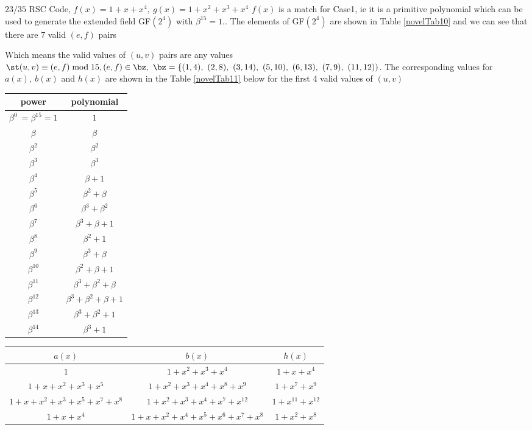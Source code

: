 \begin{example}
$23/35$ RSC Code, $f(x)=1+x+x^4,~g(x)=1+x^2+x^3+x^4$ \newline
$f(x)$ is a match for Case1, ie it is a primitive polynomial which can be used to generate the extended field GF$(2^4)$ with $\beta^{15}=1$.. The elements of GF$(2^4)$ are shown in Table \ref{novelTab10} and we can see that there are $7$ valid $(e,f)$ pairs
 
 Which means the valid values of $(u,v)$ pairs are any values $\st (u,v) \equiv (e,f) \bmod 15, (e,f) \in \bz,~\bz=\{(1,4),~(2,8) ,~(3,14) ,~(5,10) ,~(6,13) ,~(7,9) ,~(11,12))$.
 The corresponding values for $a(x),~b(x)$ and $h(x)$ are shown in the Table \ref{novelTab11} below for the first 4 valid values of $(u,v)$
 
  \begin{table*}[h]
 \caption{Non-zero Elements of GF$(2^4)$ generated by $f(x)=1+x+x^4$}
\centering
 \begin{tabular}{c c} 
 \hline
 power & polynomial \\ [0.5ex] 
 \hline\hline
$\beta^0~=\beta^{15}=1$ & $1$\\
\hline
$\beta$ & $\beta$\\
\hline
$\beta^2$ &  $\beta^2$\\
\hline
$\beta^3$ & $\beta^3$\\
\hline
$\beta^4$ &  $\beta+1$\\
\hline
$\beta^5$ & $\beta^2+\beta$\\
\hline
$\beta^6$ &  $\beta^3+\beta^2$\\
\hline
$\beta^7$ & $\beta^3+\beta+1$\\
\hline
$\beta^8$ &  $\beta^2+1$\\
\hline
$\beta^9$ & $\beta^3+\beta$\\
\hline
$\beta^{10}$ &  $\beta^2+\beta+1$\\
\hline
$\beta^{11}$ & $\beta^3+\beta^2+\beta$\\
\hline
$\beta^{12}$ &  $\beta^3+\beta^2+\beta+1$\\
\hline
$\beta^{13}$ & $\beta^3+\beta^2+1$\\
\hline
$\beta^{14}$ &  $\beta^3+1$\\
 \end{tabular}
 \label{novelTab10}
\end{table*}
 
 \begin{table*}[h]
 \caption{$23/35$ RSC, $f(x)=1+x+x^4$}
\centering
 \begin{tabular}{c c c} 
 \hline
 $a(x)$ & $b(x)$ & $h(x)$\\ [0.5ex] 
 \hline\hline
$1$ & $1+x^2+x^3+x^4$ & $1+x+x^4$\\ 
\hline
$1+x+x^2+x^3+x^5$ &  $1+x^2+x^3+x^4+x^8+x^9$ & $1+x^7+x^9$ \\
\hline
$1+x+x^2+x^3+x^5+x^7+x^8$ & $1+x^2+x^3+x^4+x^7+x^{12}$ & $1+x^{11}+x^{12}$\\
\hline
$1+x+x^4$ & $1+x+x^2+x^4+x^5+x^6+x^7+x^8$  &$1+x^2+x^8$
 \end{tabular}
 \label{novelTab11}
\end{table*}
 

\end{example}
